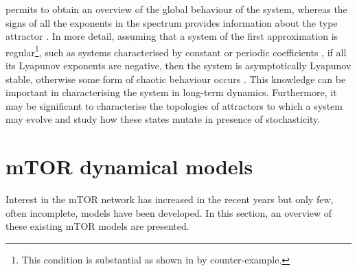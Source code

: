 permits to obtain an overview of the global behaviour of the system, whereas the signs of all the exponents in the spectrum provides information about the type attractor \citep{Parks1992}. In more detail, assuming that a system of the first approximation is regular\footnote{This condition is substantial \citep{Leonov2007} as shown in \citep{Perron1930} by counter-example.}, such as systems characterised by constant or periodic coefficients \citep{Leonov2007, Kuznetsov2008}, if all its Lyapunov exponents are negative, then the system is asymptotically Lyapunov stable, otherwise some form of chaotic behaviour occurs \citep{Lyapunov1892, Parks1992, Kuznetsov2008}. This knowledge can be important in characterising the system in long-term dynamics. Furthermore, it may be significant to characterise the topologies of attractors to which a system may evolve and study how these states mutate in presence of stochasticity. 



\section{mTOR dynamical models}
\label{sec:mTOR dynamical models}
Interest in the mTOR network has increased in the recent years but only few, often incomplete, models have been developed. In this section, an overview of these existing mTOR models are presented.

